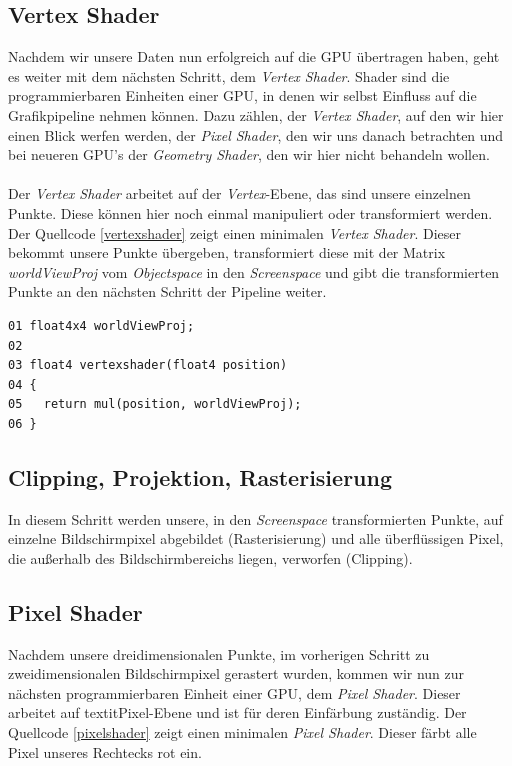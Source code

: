 \begin{Spacing}{\mylinespace}
\subsection{Vertex Shader}
Nachdem wir unsere Daten nun erfolgreich auf die GPU übertragen haben, geht es weiter mit dem nächsten Schritt, dem \textit{Vertex Shader}. Shader sind die programmierbaren Einheiten einer GPU, in denen wir selbst Einfluss auf die Grafikpipeline nehmen können. Dazu zählen, der \textit{Vertex Shader}, auf den wir hier einen Blick werfen werden, der \textit{Pixel Shader}, den wir uns danach betrachten und bei neueren GPU's der \textit{Geometry Shader}, den wir hier nicht behandeln wollen.
\\\\
Der \textit{Vertex Shader} arbeitet auf der \textit{Vertex}-Ebene, das sind unsere einzelnen Punkte. Diese können hier noch einmal manipuliert oder transformiert werden.
Der Quellcode \ref{vertexshader} zeigt einen minimalen \textit{Vertex Shader}. Dieser bekommt unsere Punkte übergeben, transformiert diese mit der Matrix \textit{worldViewProj} vom \textit{Objectspace} in den \textit{Screenspace} und gibt die transformierten Punkte an den nächsten Schritt der Pipeline weiter.

\begin{lstlisting}[captionpos=b, caption=Vertex Shader unseres Rechtecks., label=vertexshader]
01 float4x4 worldViewProj;
02
03 float4 vertexshader(float4 position)
04 {
05   return mul(position, worldViewProj);		
06 }
\end{lstlisting}

\subsection{Clipping, Projektion, Rasterisierung}
In diesem Schritt werden unsere, in den \textit{Screenspace} transformierten Punkte, auf einzelne Bildschirmpixel abgebildet (Rasterisierung) und alle überflüssigen Pixel, die außerhalb des Bildschirmbereichs liegen, verworfen (Clipping).

\subsection{Pixel Shader}
Nachdem unsere dreidimensionalen Punkte, im vorherigen Schritt zu zweidimensionalen Bildschirmpixel gerastert wurden, kommen wir nun zur nächsten programmierbaren Einheit einer GPU, dem \textit{Pixel Shader}. Dieser arbeitet auf textit{Pixel}-Ebene und ist für deren Einfärbung zuständig. Der Quellcode \ref{pixelshader} zeigt einen minimalen \textit{Pixel Shader}. Dieser färbt alle Pixel unseres Rechtecks rot ein.


\end{Spacing}
